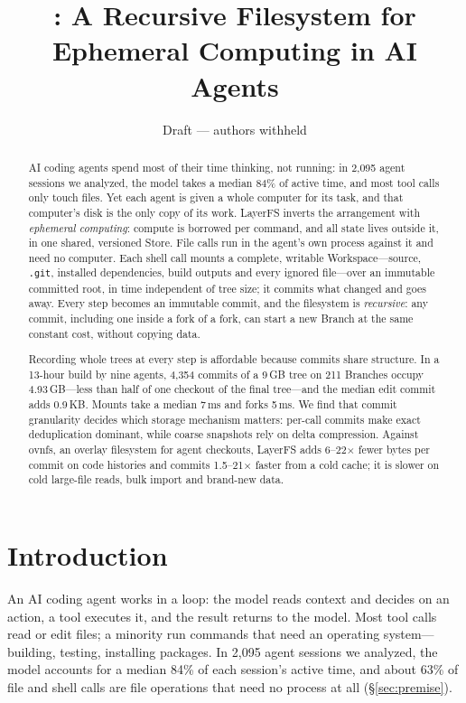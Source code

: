 \documentclass[letterpaper,twocolumn,10pt]{article}
\title{\sys{}: A Recursive Filesystem for\\ Ephemeral Computing in AI Agents}
\author{Draft --- authors withheld}
\date{}
\newcommand{\sys}{LayerFS}
\newcommand{\ws}{Workspace}
\newcommand{\X}{$\times$}
\begin{document}
\maketitle

\begin{abstract}
AI coding agents spend most of their time thinking, not running: in 2,095
agent sessions we analyzed, the model takes a median 84\% of active time,
and most tool calls only touch files. Yet each agent is given a whole
computer for its task, and that computer's disk is the only copy of its
work. \sys{} inverts the arrangement with \emph{ephemeral computing}:
compute is borrowed per command, and all state lives outside it, in one
shared, versioned Store.
File calls run in the agent's own process against it and need no computer.
Each shell call mounts a complete, writable \ws{}---source, \texttt{.git},
installed dependencies, build outputs and every ignored file---over an
immutable committed root, in time independent of tree size; it commits what
changed and goes away. Every step becomes an immutable commit, and the
filesystem is \emph{recursive}: any commit, including one inside a fork of
a fork, can start a new Branch at the same constant cost, without copying
data.

Recording whole trees at every step is affordable because commits share
structure. In a 13-hour build by nine agents, 4,354 commits of a 9\,GB tree
on 211 Branches occupy 4.93\,GB---less than half of one checkout of the
final tree---and the median edit commit adds 0.9\,KB. Mounts take a median
7\,ms and forks 5\,ms. We find that commit granularity decides which storage
mechanism matters: per-call commits make exact deduplication dominant,
while coarse snapshots rely on delta compression. Against ovnfs, an overlay
filesystem for agent checkouts, \sys{} adds 6--22\X{} fewer bytes per
commit on code histories and commits 1.5--21\X{} faster from a cold cache;
it is slower on cold large-file reads, bulk import and brand-new data.
\end{abstract}

\section{Introduction}

An AI coding agent works in a loop: the model reads context and decides on
an action, a tool executes it, and the result returns to the model. Most
tool calls read or edit files; a minority run commands that need an
operating system---building, testing, installing packages. In 2,095 agent
sessions we analyzed, the model accounts for a median 84\% of each
session's active time, and about 63\% of file and shell calls are file
operations that need no process at all (\S\ref{sec:premise}).
\end{document}
